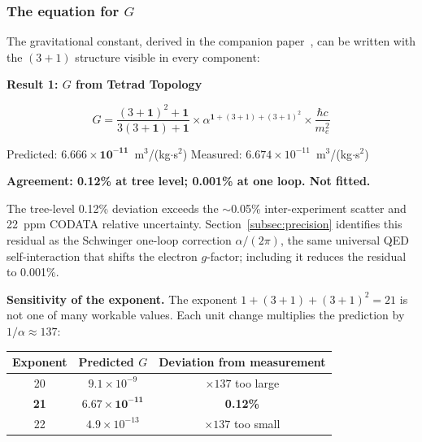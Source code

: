 \documentclass[aps,prd,preprint,superscriptaddress,showpacs,preprintnumbers,amsmath,amssymb,nofootinbib]{revtex4-2}
\begin{document}
\subsubsection*{The equation for $G$}

The gravitational constant, derived in the companion paper~\cite{paper6}, can be written with the $(3+1)$ structure visible in every component:

\vspace{1.5em}
\noindent
\colorbox{resultgreen}{\parbox{\dimexpr\textwidth-2\fboxsep\relax}{%
\vspace{0.8em}
\centering
\textbf{\large Result 1: $G$ from Tetrad Topology}

\vspace{0.5em}
\boldmath
\begin{equation}
G = \frac{(3+\mathbf{1})^2 + \mathbf{1}}{3(3+\mathbf{1}) + \mathbf{1}} \times \alpha^{\mathbf{1}+(3+1)+(3+1)^2} \times \frac{\hbar c}{m_e^2}
\label{eq:master}
\end{equation}
\unboldmath

\vspace{0.3em}
Predicted: $\bm{6.666 \times 10^{-11}}$~m$^3$/(kg$\cdot$s$^2$) \quad Measured: $6.674 \times 10^{-11}$~m$^3$/(kg$\cdot$s$^2$)

\textbf{Agreement: 0.12\% at tree level; 0.001\% at one loop. Not fitted.}
\vspace{0.5em}
}}
\vspace{1cm}

The tree-level 0.12\% deviation exceeds the $\sim$0.05\% inter-experiment scatter and 22~ppm CODATA relative uncertainty. Section~\ref{subsec:precision} identifies this residual as the Schwinger one-loop correction $\alpha/(2\pi)$, the same universal QED self-interaction that shifts the electron $g$-factor; including it reduces the residual to 0.001\%.

\textbf{Sensitivity of the exponent.} The exponent $1 + (3+1) + (3+1)^2 = 21$ is not one of many workable values. Each unit change multiplies the prediction by $1/\alpha \approx 137$:

\begin{center}
\begin{tabular}{ccc}
\toprule
\textbf{Exponent} & \textbf{Predicted $G$} & \textbf{Deviation from measurement} \\
\midrule
20 & $9.1 \times 10^{-9}$ & $\times 137$ too large \\
\textbf{21} & $\bm{6.67 \times 10^{-11}}$ & \textbf{0.12\%} \\
22 & $4.9 \times 10^{-13}$ & $\times 137$ too small \\
\bottomrule
\end{tabular}
\end{center}
\end{document}
